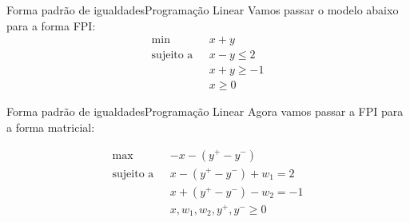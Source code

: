 \documentclass[t]{beamer}
\begin{document}

\begin{ftst}{Forma padrão de igualdades}{Programação Linear}
Vamos passar o modelo abaixo para a forma FPI:
\vone
    \begin{align*}
        \text{min} \ \ \ & x + y  \\ 
        \text{sujeito a} \ \ \  & x - y \leq 2 \\
        \text{} \ \ \ & x + y \geq -1 \\
        \text{} \ \ \ & x \geq 0
    \end{align*}

\end{ftst}


\begin{ftst}{Forma padrão de igualdades}{Programação Linear}
Agora vamos passar a FPI para a forma matricial:

\begin{align*}
        \text{max} \ \ \ & - x - (y^+ - y^-)  \\ 
        \text{sujeito a} \ \ \  & x - (y^+ - y^-) + w_1 = 2 \\
        \text{} \ \ \ & x + (y^+ - y^-) - w_2 = -1 \\
        \text{} \ \ \ & x, w_1, w_2, y^+, y^- \geq 0
\end{align*}

\end{ftst}

\end{document}
